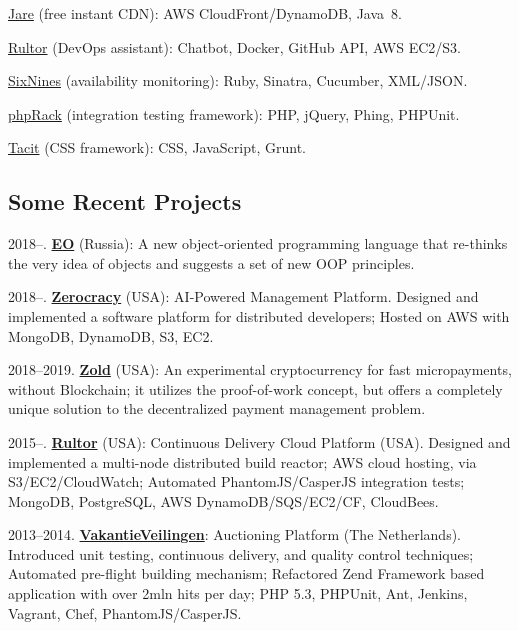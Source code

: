 \documentclass{yb}
\begin{document}
\href{https://www.jare.io}{Jare} (free instant CDN):
AWS CloudFront/DynamoDB, Java~8.

\href{https://www.rultor.com}{Rultor} (DevOps assistant):
Chatbot, Docker, GitHub API, AWS EC2/S3.

\href{https://www.sixnines.io}{SixNines} (availability monitoring):
Ruby, Sinatra, Cucumber, XML/JSON.

\href{https://www.phprack.com}{phpRack} (integration testing framework):
PHP, jQuery, Phing, PHPUnit.

\href{https://github.com/yegor256/tacit}{Tacit} (CSS framework):
CSS, JavaScript, Grunt.

\subsection*{Some Recent Projects}


2018--. \href{https://www.eolang.org}{\textbf{EO}} (Russia): A new object-oriented
programming language that re-thinks the very idea of objects
and suggests a set of new OOP principles.

2018--. \href{https://www.zerocracy.com}{\textbf{Zerocracy}} (USA): AI-Powered Management Platform.
Designed and implemented a software platform for distributed developers;
Hosted on AWS with MongoDB, DynamoDB, S3, EC2.

2018--2019. \href{https://www.zold.io}{\textbf{Zold}} (USA): An experimental cryptocurrency for
fast micropayments, without Blockchain; it utilizes the proof-of-work
concept, but offers a completely unique solution to the decentralized
payment management problem.

2015--. \href{https://www.rultor.com}{\textbf{Rultor}} (USA): Continuous Delivery Cloud Platform (USA).
Designed and implemented a multi-node distributed build reactor;
AWS cloud hosting, via S3/EC2/CloudWatch;
Automated PhantomJS/CasperJS integration tests;
MongoDB, PostgreSQL, AWS DynamoDB/SQS/EC2/CF, CloudBees.

2013--2014. \href{https://www.VakantieVeilingen.nl}{\textbf{VakantieVeilingen}}: Auctioning Platform (The Netherlands).
Introduced unit testing, continuous delivery, and quality control techniques;
Automated pre-flight building mechanism;
Refactored Zend Framework based application with over 2mln hits per day;
PHP 5.3, PHPUnit, Ant, Jenkins, Vagrant, Chef, PhantomJS/CasperJS.
\end{document}
